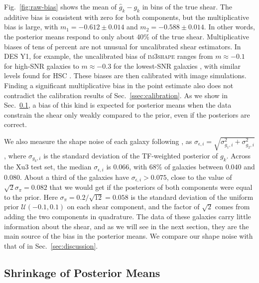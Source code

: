 Fig.~\ref{fig:raw-bias} shows the mean of $\hat{g}_k - g_k$ in bins of the true shear. The additive bias is consistent with zero for both components, but the multiplicative bias is large, with $m_1 = -0.612 \pm 0.014$ and $m_2 = -0.588 \pm 0.014$. In other words, the posterior means respond to only about 40\% of the true shear. Multiplicative biases of tens of percent are not unusual for uncalibrated shear estimators. In DES Y1, for example, the uncalibrated bias of \textsc{im3shape} ranges from $m\approx-0.1$ for high-SNR galaxies to $m\approx-0.3$ for the lowest-SNR galaxies \citep{DESY1Shape}, with similar levels found for HSC \citep{HSCY1Sims}. These biases are then calibrated with image simulations. Finding a significant multiplicative bias in the point estimate also does not contradict the calibration results of Sec.~\ref{ssec:calibration}. As we show in Sec.~\ref{ssec:shrinkage}, a bias of this kind is expected for posterior means when the data constrain the shear only weakly compared to the prior, even if the posteriors are correct.

We also measure the shape noise of each galaxy following \citep{KLDESI}, as $\sigma_{\epsilon,i} = \sqrt{\sigma_{g_1,i}^2 + \sigma_{g_2,i}^2}$, where $\sigma_{g_k,i}$ is the standard deviation of the TF-weighted posterior of $g_k$. Across the Xu3 test set, the median $\sigma_{\epsilon,i}$ is 0.066, with 68\% of galaxies between 0.040 and 0.080. About a third of the galaxies have $\sigma_{\epsilon,i} > 0.075$, close to the value of $\sqrt{2}\sigma_\pi = 0.082$ that we would get if the posteriors of both components were equal to the prior. Here $\sigma_\pi = 0.2/\sqrt{12} = 0.058$ is the standard deviation of the uniform prior $\mathcal{U}(-0.1, 0.1)$ on each shear component, and the factor of $\sqrt{2}$ comes from adding the two components in quadrature. The data of these galaxies carry little information about the shear, and as we will see in the next section, they are the main source of the bias in the posterior means. We compare our shape noise with that of \citep{KLDESI} in Sec.~\ref{sec:discussion}.

\subsection{Shrinkage of Posterior Means}
\label{ssec:shrinkage}

